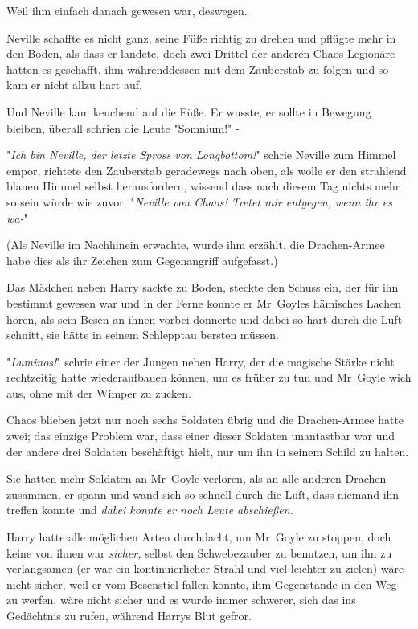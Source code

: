 {Weil ihm einfach danach gewesen war, deswegen.

Neville schaffte es nicht ganz, seine Füße richtig zu drehen und pflügte mehr in den Boden, als dass er landete, doch zwei Drittel der anderen Chaos-Legionäre hatten es geschafft, ihm währenddessen mit dem Zauberstab zu folgen und so kam er nicht allzu hart auf.

Und Neville kam keuchend auf die Füße. Er wusste, er sollte in Bewegung bleiben, überall schrien die Leute "Somnium!" -

"\emph{Ich bin Neville, der letzte Spross von Longbottom!}" schrie Neville zum Himmel empor, richtete den Zauberstab geradewegs nach oben, als wolle er den strahlend blauen Himmel selbst herausfordern, wissend dass nach diesem Tag nichts mehr so sein würde wie zuvor. "\emph{Neville von Chaos! Tretet mir entgegen, wenn ihr es wa-}"

(Als Neville im Nachhinein erwachte, wurde ihm erzählt, die Drachen-Armee habe dies als ihr Zeichen zum Gegenangriff aufgefasst.)

\later

Das Mädchen neben Harry sackte zu Boden, steckte den Schuss ein, der für ihn bestimmt gewesen war und in der Ferne konnte er Mr~Goyles hämisches Lachen hören, als sein Besen an ihnen vorbei donnerte und dabei so hart durch die Luft schnitt, sie hätte in seinem Schlepptau bersten müssen.

"\emph{Luminos!}" schrie einer der Jungen neben Harry, der die magische Stärke nicht rechtzeitig hatte wiederaufbauen können, um es früher zu tun und Mr~Goyle wich aus, ohne mit der Wimper zu zucken.

Chaos blieben jetzt nur noch sechs Soldaten übrig und die Drachen-Armee hatte zwei; das einzige Problem war, dass einer dieser Soldaten unantastbar war und der andere drei Soldaten beschäftigt hielt, nur um ihn in seinem Schild zu halten.

Sie hatten mehr Soldaten an Mr~Goyle verloren, als an alle anderen Drachen zusammen, er spann und wand sich so schnell durch die Luft, dass niemand ihn treffen konnte und \emph{dabei konnte er noch Leute abschießen.}

Harry hatte alle möglichen Arten durchdacht, um Mr~Goyle zu stoppen, doch keine von ihnen war \emph{sicher,} selbst den Schwebezauber zu benutzen, um ihn zu verlangsamen (er war ein kontinuierlicher Strahl und viel leichter zu zielen) wäre nicht sicher, weil er vom Besenstiel fallen könnte, ihm Gegenstände in den Weg zu werfen, wäre nicht sicher und es wurde immer schwerer, sich das ins Gedächtnis zu rufen, während Harrys Blut gefror.

}
